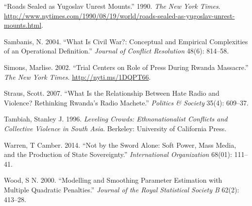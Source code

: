 \documentclass[11pt,article,oneside]{memoir}
\begin{document}
``Roads Sealed as Yugoslav Unrest Mounts.'' 1990. \emph{The New York
Times}.
\url{http://www.nytimes.com/1990/08/19/world/roads-sealed-as-yugoslav-unrest-mounts.html}.

Sambanis, N. 2004. ``What Is Civil War?: Conceptual and Empirical
Complexities of an Operational Definition.'' \emph{Journal of Conflict
Resolution} 48(6): 814--58.

Simons, Marlise. 2002. ``Trial Centers on Role of Press During Rwanda
Massacre.'' \emph{The New York Times}. \url{http://nyti.ms/1DQPT66}.

Straus, Scott. 2007. ``What Is the Relationship Between Hate Radio and
Violence? Rethinking Rwanda's Radio Machete.'' \emph{Politics \&
Society} 35(4): 609--37.

Tambiah, Stanley J. 1996. \emph{Leveling Crowds: Ethnonationalist
Conflicts and Collective Violence in South Asia}. Berkeley: University
of California Press.

Warren, T Camber. 2014. ``Not by the Sword Alone: Soft Power, Mass
Media, and the Production of State Sovereignty.'' \emph{International
Organization} 68(01): 111--41.

Wood, S N. 2000. ``Modelling and Smoothing Parameter Estimation with
Multiple Quadratic Penalties.'' \emph{Journal of the Royal Statistical
Society B} 62(2): 413--28.
\end{document}
